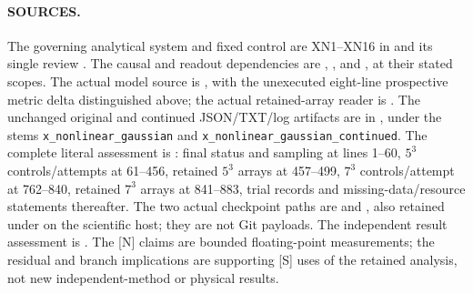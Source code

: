\documentclass[11pt]{article}
\begin{document}
\paragraph{SOURCES.}
The governing analytical system and fixed control are
XN1--XN16 in 
and its single review
.
The causal and readout dependencies are
,
, and
, at their stated scopes.
The actual model source is
, with the
unexecuted eight-line prospective metric delta distinguished
above; the actual retained-array reader is
.
The unchanged original and continued JSON/TXT/log artifacts
are in , under
the stems \texttt{x\_nonlinear\_gaussian} and
\texttt{x\_nonlinear\_gaussian\_continued}.
The complete literal assessment is
:
final status and sampling at lines 1--60,
$5^3$ controls/attempts at 61--456,
retained $5^3$ arrays at 457--499,
$7^3$ controls/attempt at 762--840,
retained $7^3$ arrays at 841--883,
trial records and missing-data/resource statements thereafter.
The two actual checkpoint paths are
and
,
also retained under
on the scientific host; they are not Git payloads.
The independent result assessment is
.
The [N] claims are bounded floating-point measurements;
the residual and branch implications are supporting [S]
uses of the retained analysis, not new independent-method
or physical results.
\end{document}
